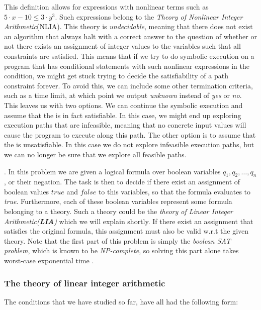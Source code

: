 	This definition allows for expressions with nonlinear terms such as $ 5\cdot x - 10 \leq 3 \cdot y^3$. Such expressions belong to the \emph{Theory of Nonlinear Integer Arithmetic}(NLIA). This theory is \emph{undecidable}, meaning that there does not exist an algorithm that always halt with a correct answer to the question of whether or not there exists an assignment of integer values to the variables such that all constraints are satisfied. This means that if we try to do symbolic execution on a program that has conditional statements with such nonlinear expressions in the condition, we might get stuck trying to decide the satisfiability of a path constraint forever. To avoid this, we can include some other termination criteria, such as a time limit, at which point we output \emph{unknown} instead of \emph{yes} or \emph{no}. This leaves us with two options. We can continue the symbolic execution and assume that the \pc is in fact satisfiable. In this case, we might end up exploring execution paths that are infeasible, meaning that no concrete input values will cause the program to execute along this path. The other option is to assume that the \pc is unsatisfiable. In this case we do not explore infeasible execution paths, but we can no longer be sure that we explore all feasible paths.
	
	
	
	
	
	
	
	
	
	\iffalse. In this problem we are given a logical formula over boolean variables $q_1, q_2, \ldots, q_n$, or their negation. The task is then to decide if there exist an assignment of boolean values $true$ and $false$ to this variables, so that the formula evaluates to \emph{true}. Furthermore, each of these boolean variables represent some formula belonging to a theory. Such a theory could be the \emph{theory of Linear Integer Arithmetic(\textbf{LIA})} which we will explain shortly. If there exist an assignment that satisfies the original formula, this assignment must also be valid w.r.t the given theory. Note that the first part of this problem is simply the \emph{boolean SAT problem}, which is known to be \emph{NP-complete}, so solving this part alone takes worst-case exponential time \cite{DeMoura2011}.
	

	\subsubsection{The theory of linear integer arithmetic}
		The conditions that we have studied so far, have all had the following form:
		
